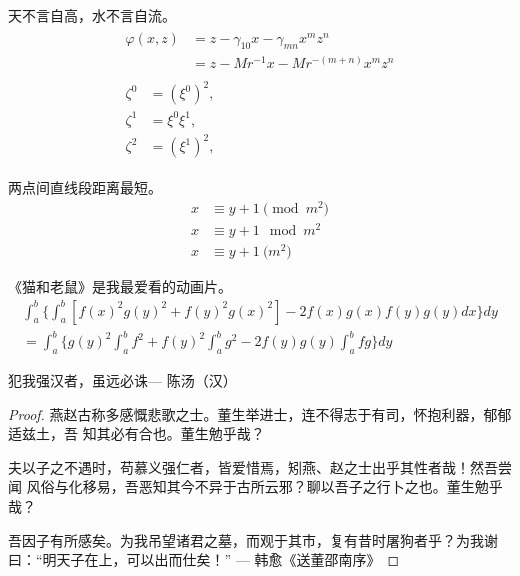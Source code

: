 \begin{remark}
    \label{thm-remark-example}
    天不言自高，水不言自流。
    \begin{gather*}
        \begin{split}
            \varphi(x,z)
            & = z-\gamma_{10}x-\gamma_{mn}x^mz^n\\
            & = z-Mr^{-1}x-Mr^{-(m+n)}x^mz^n
        \end{split} \\[6pt]
        \begin{align}
            \zeta^0 & = (\xi^0)^2,\\
            \zeta^1 & = \xi^0\xi^1,\\
            \zeta^2 & = (\xi^1)^2,
        \end{align}
    \end{gather*}
\end{remark}

\begin{axiom}
    \label{thm-axiom-example}
    两点间直线段距离最短。
    \begin{align}
        x & \equiv y+1\pmod{m^2}\\
        x & \equiv y+1\mod{m^2}\\
        x & \equiv y+1\pod{m^2}
    \end{align}
\end{axiom}

\begin{lemma}
    \label{thm-lemma-example}
    《猫和老鼠》是我最爱看的动画片。
    \begin{multline*}%
        \int_a^b\biggl\{\int_a^b[f(x)^2g(y)^2+f(y)^2g(x)^2]
        -2f(x)g(x)f(y)g(y)dx\biggr\}dy \\
        =\int_a^b\biggl\{g(y)^2\int_a^bf^2
        +f(y)^2\int_a^bg^2-2f(y)g(y)\int_a^b fg\biggr\}dy
    \end{multline*}
\end{lemma}

\begin{theorem}
    \label{thm-theorem-example}
    犯我强汉者，虽远必诛\hfill --- 陈汤（汉）
\end{theorem}

\begin{proof}
    \label{thm-proof-example}
    燕赵古称多感慨悲歌之士。董生举进士，连不得志于有司，怀抱利器，郁郁适兹土，吾
    知其必有合也。董生勉乎哉？

    夫以子之不遇时，苟慕义强仁者，皆爱惜焉，矧燕、赵之士出乎其性者哉！然吾尝闻
    风俗与化移易，吾恶知其今不异于古所云邪？聊以吾子之行卜之也。董生勉乎哉？

    吾因子有所感矣。为我吊望诸君之墓，而观于其市，复有昔时屠狗者乎？为我谢
    曰：“明天子在上，可以出而仕矣！” \hfill --- 韩愈《送董邵南序》
\end{proof}

